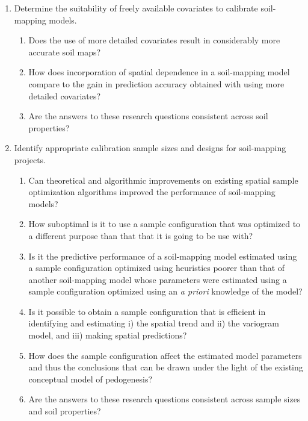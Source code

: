 \begin{enumerate}
\item Determine the suitability of freely available covariates to calibrate soil-mapping models.

	\begin{enumerate}[label=(\alph*)]
	\item Does the use of more detailed covariates result in considerably more accurate soil 
	maps?

	\item How does incorporation of spatial dependence in a soil-mapping model compare to the 
	gain in prediction accuracy obtained with using more detailed covariates?

	\item Are the answers to these research questions consistent across soil properties?
	\end{enumerate}

\item Identify appropriate calibration sample sizes and designs for soil-mapping projects.

	\begin{enumerate}[label=(\alph*)]
	\item Can theoretical and algorithmic improvements on existing spatial sample optimization 
	algorithms improved the performance of soil-mapping models?
	
	\item How suboptimal is it to use a sample configuration that was optimized to a different 
	purpose than that that it is going to be use with?

	\item Is it the predictive performance of a soil-mapping model estimated using a sample 
	configuration optimized using heuristics poorer than that of another soil-mapping model 
	whose parameters were estimated using a sample configuration optimized using an 
	\textit{a priori} knowledge of the model?
	
	\item Is it possible to obtain a sample configuration that is efficient in identifying and
	estimating i) the spatial trend and ii) the variogram model, and iii) making spatial 
	predictions?
	
	\item How does the sample configuration affect the estimated model parameters and thus the
	conclusions that can be drawn under the light of the existing conceptual model of 
	pedogenesis?
	
	\item Are the answers to these research questions consistent across sample sizes and soil 
	properties?
	\end{enumerate}
\end{enumerate}


